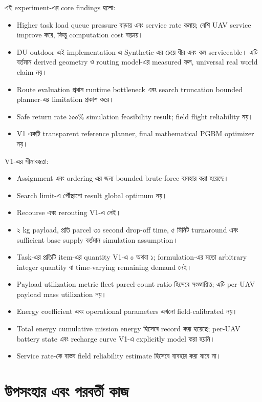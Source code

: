 \documentclass[10pt,a4paper]{article}
\begin{document}
এই experiment-এর core findings হলো:
\begin{itemize}
\item Higher task load queue pressure বাড়ায় এবং service rate কমায়; বেশি UAV service improve করে, কিন্তু computation cost বাড়ায়।
\item DU outdoor এই implementation-এ Synthetic-এর চেয়ে ধীর এবং কম serviceable। এটি বর্তমান derived geometry ও routing model-এর measured ফল, universal real world claim নয়।
\item Route evaluation প্রধান runtime bottleneck এবং search truncation bounded planner-এর limitation প্রকাশ করে।
\item Safe return rate ১০০\% simulation feasibility result; field flight reliability নয়।
\item V1 একটি transparent reference planner, final mathematical PGBM optimizer নয়।
\end{itemize}

V1-এর সীমাবদ্ধতা:

\begin{itemize}
\item Assignment এবং ordering-এর জন্য bounded brute-force ব্যবহার করা হয়েছে।
\item Search limit-এ পৌঁছানো result global optimum নয়।
\item Recourse এবং rerouting V1-এ নেই।
\item ২ kg payload, প্রতি parcel ৩০ second drop-off time, ৫ মিনিট turnaround এবং sufficient base supply বর্তমান simulation assumption।
\item Task-এর প্রতিটি item-এর quantity V1-এ ০ অথবা ১; formulation-এর মতো arbitrary integer quantity বা time-varying remaining demand নেই।
\item Payload utilization metric fleet parcel-count ratio হিসেবে সংজ্ঞায়িত; এটি per-UAV payload mass utilization নয়।
\item Energy coefficient এবং operational parameters এখনো field-calibrated নয়।
\item Total energy cumulative mission energy হিসেবে record করা হয়েছে; per-UAV battery state এবং recharge curve V1-এ explicitly model করা হয়নি।
\item Service rate-কে বাস্তব field reliability estimate হিসেবে ব্যবহার করা যাবে না।
\end{itemize}

\section{উপসংহার এবং পরবর্তী কাজ}
\end{document}
